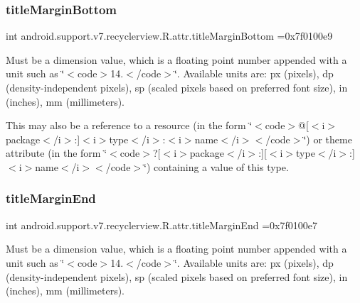 \subsubsection{\texorpdfstring{title\+Margin\+Bottom}{titleMarginBottom}}
{\footnotesize\ttfamily int android.\+support.\+v7.\+recyclerview.\+R.\+attr.\+title\+Margin\+Bottom =0x7f0100e9\hspace{0.3cm}{\ttfamily [static]}}

Must be a dimension value, which is a floating point number appended with a unit such as \char`\"{}$<$code$>$14.\+5sp$<$/code$>$\char`\"{}. Available units are\+: px (pixels), dp (density-\/independent pixels), sp (scaled pixels based on preferred font size), in (inches), mm (millimeters). 

This may also be a reference to a resource (in the form \char`\"{}$<$code$>$@\mbox{[}$<$i$>$package$<$/i$>$\+:\mbox{]}$<$i$>$type$<$/i$>$\+:$<$i$>$name$<$/i$>$$<$/code$>$\char`\"{}) or theme attribute (in the form \char`\"{}$<$code$>$?\mbox{[}$<$i$>$package$<$/i$>$\+:\mbox{]}\mbox{[}$<$i$>$type$<$/i$>$\+:\mbox{]}$<$i$>$name$<$/i$>$$<$/code$>$\char`\"{}) containing a value of this type. \mbox{\label{classandroid_1_1support_1_1v7_1_1recyclerview_1_1R_1_1attr_ac24225efdc0b6f7ba7fb2e4c1f9a3a37}} 
\subsubsection{\texorpdfstring{title\+Margin\+End}{titleMarginEnd}}
{\footnotesize\ttfamily int android.\+support.\+v7.\+recyclerview.\+R.\+attr.\+title\+Margin\+End =0x7f0100e7\hspace{0.3cm}{\ttfamily [static]}}

Must be a dimension value, which is a floating point number appended with a unit such as \char`\"{}$<$code$>$14.\+5sp$<$/code$>$\char`\"{}. Available units are\+: px (pixels), dp (density-\/independent pixels), sp (scaled pixels based on preferred font size), in (inches), mm (millimeters). 

